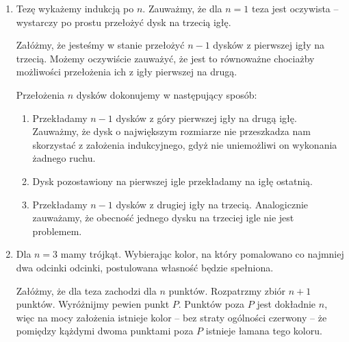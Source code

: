 \begin{enumerate}
	\item
	Tezę wykażemy indukcją po $n$. Zauważmy, że dla $n = 1$ teza jest oczywista -- wystarczy po prostu przełożyć dysk na trzecią igłę.

	Załóżmy, że jesteśmy w stanie przełożyć $n - 1$ dysków z pierwszej igły na trzecią. Możemy oczywiście zauważyć, że jest to równoważne chociażby możliwości przełożenia ich z igły pierwszej na drugą.

	Przełożenia $n$ dysków dokonujemy w następujący sposób:

	\begin{enumerate}
		\item Przekładamy $n - 1$ dysków z góry pierwszej igły na drugą igłę. Zauważmy, że dysk o największym rozmiarze nie przeszkadza nam skorzystać z założenia indukcyjnego, gdyż nie uniemożliwi on wykonania żadnego ruchu.

		\item Dysk pozostawiony na pierwszej igle przekładamy na igłę ostatnią.

		\item Przekładamy $n - 1$ dysków z drugiej igły na trzecią. Analogicznie zauważamy, że obecność jednego dysku na trzeciej igle nie jest problemem.
	\end{enumerate}

	\item Dla $n = 3$ mamy trójkąt. Wybierając kolor, na który pomalowano co najmniej dwa odcinki odcinki, postulowana własność będzie spełniona.

	Załóżmy, że dla teza zachodzi dla $n$ punktów. Rozpatrzmy zbiór $n + 1$ punktów. Wyróżnijmy pewien punkt $P$. Punktów poza $P$ jest dokładnie $n$, więc na mocy założenia istnieje kolor -- bez straty ogólności czerwony -- że pomiędzy kążdymi dwoma punktami poza $P$ istnieje łamana tego koloru. 

\begin{minipage}{0.5\textwidth}
\begin{center}
	\\
	

\end{center}
\end{minipage}
\end{enumerate}
